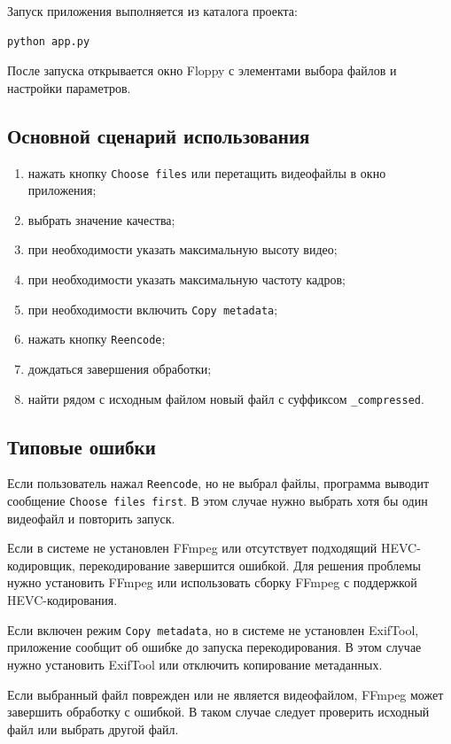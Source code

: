 \documentclass[14pt,a4paper]{extarticle}
\begin{document}
Запуск приложения выполняется из каталога проекта:

\begin{verbatim}
python app.py
\end{verbatim}

После запуска открывается окно Floppy с элементами выбора файлов и настройки параметров.

\subsection{Основной сценарий использования}

\begin{enumerate}
	\item нажать кнопку \texttt{Choose files} или перетащить видеофайлы в окно приложения;
	\item выбрать значение качества;
	\item при необходимости указать максимальную высоту видео;
	\item при необходимости указать максимальную частоту кадров;
	\item при необходимости включить \texttt{Copy metadata};
	\item нажать кнопку \texttt{Reencode};
	\item дождаться завершения обработки;
	\item найти рядом с исходным файлом новый файл с суффиксом \texttt{\_compressed}.
\end{enumerate}

\subsection{Типовые ошибки}

Если пользователь нажал \texttt{Reencode}, но не выбрал файлы, программа выводит сообщение \texttt{Choose files first}. В этом случае нужно выбрать хотя бы один видеофайл и повторить запуск.

Если в системе не установлен FFmpeg или отсутствует подходящий HEVC-кодировщик, перекодирование завершится ошибкой. Для решения проблемы нужно установить FFmpeg или использовать сборку FFmpeg с поддержкой HEVC-кодирования.

Если включен режим \texttt{Copy metadata}, но в системе не установлен ExifTool, приложение сообщит об ошибке до запуска перекодирования. В этом случае нужно установить ExifTool или отключить копирование метаданных.

Если выбранный файл поврежден или не является видеофайлом, FFmpeg может завершить обработку с ошибкой. В таком случае следует проверить исходный файл или выбрать другой файл.
\end{document}
